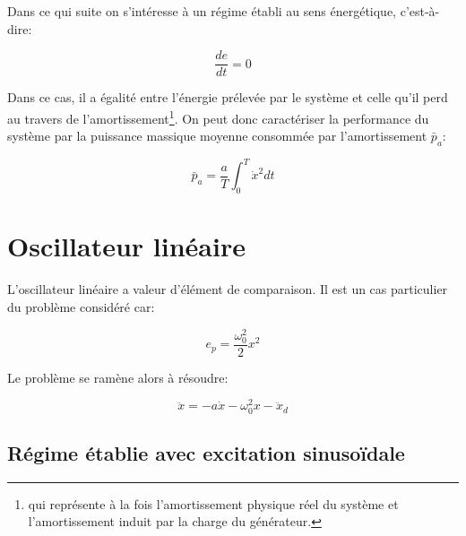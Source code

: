 \documentclass[a4paper,11pt,twoside]{article}
\begin{document}
Dans ce qui suite on s'intéresse à un régime établi au sens énergétique, c'est-à-dire:

\begin{equation}
\frac{de}{dt} = 0
\end{equation}

\noindent  Dans ce cas, il a égalité entre l'énergie prélevée par le système et celle qu'il perd au travers de l'amortissement\footnote{qui représente à la fois l'amortissement physique réel du système et l'amortissement induit par la charge du générateur.}. On peut donc caractériser la performance du système par la puissance massique moyenne consommée par l'amortissement $\bar p_a$:

\begin{equation}
\bar p_a = \frac{a}{T}\int_0^T \dot{x}^2 dt 
\end{equation}

\section{Oscillateur linéaire}

L'oscillateur linéaire a valeur d'élément de comparaison. Il est un cas particulier du problème considéré car:

\begin{equation}
e_p = \frac{\omega_0^2}{2} x^2
\end{equation}

Le problème se ramène alors à résoudre:

\begin{equation}
\ddot{x} = -a \dot{x} - \omega_0^2 x - \ddot{x}_d
\end{equation}

\subsection{Régime établie avec excitation sinusoïdale}
\end{document}
